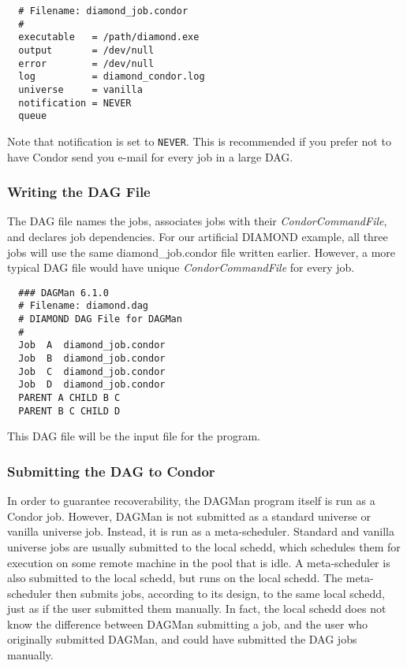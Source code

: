 \begin{verbatim}
  # Filename: diamond_job.condor
  #
  executable   = /path/diamond.exe
  output       = /dev/null
  error        = /dev/null
  log          = diamond_condor.log
  universe     = vanilla
  notification = NEVER
  queue
\end{verbatim}

Note that notification is set to \texttt{NEVER}.  This is recommended if you
prefer not to have Condor send you e-mail for every job in a large DAG.

\subsubsection{Writing the DAG File}
\label{dagman:writedag}

The DAG file names the jobs, associates jobs with their
\textit{CondorCommandFile}, and declares job dependencies.  For our artificial
DIAMOND example, all three jobs will use the same diamond\_job.condor file
written earlier.  However, a more typical DAG file would have unique
\textit{CondorCommandFile} for every job.

\begin{verbatim}
  ### DAGMan 6.1.0
  # Filename: diamond.dag
  # DIAMOND DAG File for DAGMan
  #
  Job  A  diamond_job.condor
  Job  B  diamond_job.condor
  Job  C  diamond_job.condor
  Job  D  diamond_job.condor
  PARENT A CHILD B C
  PARENT B C CHILD D
\end{verbatim}

This DAG file will be the input file for the  program.

\subsubsection{Submitting the DAG to Condor}
\label{dagman:submitdag}

In order to guarantee recoverability, the DAGMan program itself is run as a
Condor job.  However, DAGMan is not submitted as a standard universe or
vanilla universe job.  Instead, it is run as a meta-scheduler.  Standard and
vanilla universe jobs are usually submitted to the local schedd, which
schedules them for execution on some remote machine in the pool that is idle.
A meta-scheduler is also submitted to the local schedd, but runs on the local
schedd.  The meta-scheduler then submits jobs, according to its design, to the
same local schedd, just as if the user submitted them manually.  In fact, the
local schedd does not know the difference between DAGMan submitting a job, and
the user who originally submitted DAGMan, and could have submitted the DAG
jobs manually.


